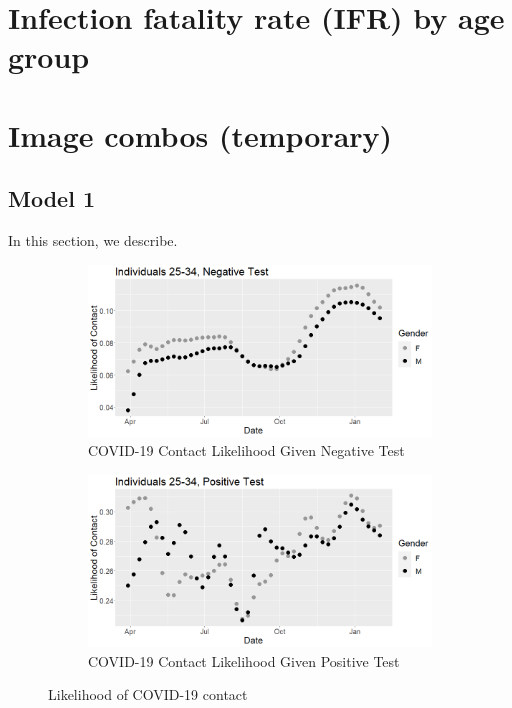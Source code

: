 \documentclass[11pt]{amsart}
\numberwithin{equation}{section}
\theoremstyle{plain}
\begin{document}
\section{Infection fatality rate (IFR) by age group}
\label{app:ifr}

\section{Image combos (temporary)}

\subsection{Model 1}

In this section, we describe.

\begin{figure}[!th]
\centering
\begin{subfigure}{.5\textwidth}
 \centering
 \includegraphics[width=.9\linewidth]{../figs/tvprop_contact_fig1.png}
 \caption{COVID-19 Contact Likelihood Given Negative Test}
 \label{fig:contactlik1}
\end{subfigure}%
\begin{subfigure}{.5\textwidth}
 \centering
\includegraphics[width=.9\linewidth]{../figs/tvprop_contact_fig2.png}
 \caption{COVID-19 Contact Likelihood Given Positive Test}
 \label{fig:contactlik2}
\end{subfigure}
\caption{Likelihood of COVID-19 contact}
\label{fig:contactlik}
\end{figure}
\end{document}
